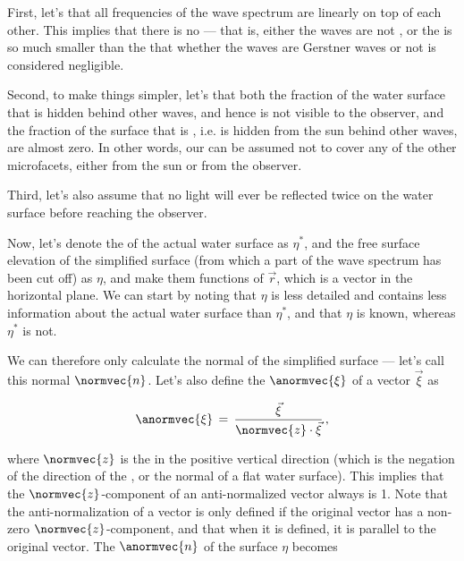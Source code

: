 {First, let's \assume that all frequencies of the wave spectrum are \superposed linearly on top of each other. This implies that there is no  --- that is, either the waves are not , or the  is so much smaller than the \wavelength that whether the waves are Gerstner waves or not is considered negligible.

Second, to make things simpler, let's \assume that both the fraction of the water surface that is hidden behind other waves, and hence is not visible to the observer, and the fraction of the surface that is \shadowed, i.e. is hidden from the sun behind other waves, are almost zero. In other words, our \microfacets can be assumed not to cover any of the other microfacets, either from the sun or from the observer.

Third, let's also assume that no light will ever be reflected twice on the water surface before reaching the observer.

Now, let's denote the  of the actual water surface as $\eta^*$, and the free surface elevation of the simplified surface (from which a part of the wave spectrum has been cut off) as $\eta$, and make them functions of $\vec{r}$, which is a \twodimensional vector in the horizontal plane. We can start by noting that $\eta$ is less detailed and contains less information about the actual water surface than $\eta^*$, and that $\eta$ is known, whereas $\eta^*$ is not.

We can therefore only calculate the normal of the simplified surface --- let's call this normal $\normvec{n}$. Let's also define the  $\anormvec{\xi}$ of a vector $\vec{\xi}$ as

\begin{equation} \label{eq:anti_normal_definition}
\anormvec{\xi} \,=\, \frac{\vec{\xi}}{\normvec{z}\cdot\vec{\xi}}\,,
\end{equation}

where $\normvec{z}$ is the  in the positive vertical direction (which is the negation of the direction of the , or the normal of a flat water surface). This implies that the $\normvec{z}$-component of an anti-normalized vector always is 1. Note that the anti-normalization of a vector is only defined if the original vector has a non-zero $\normvec{z}$-component, and that when it is defined, it is parallel to the original vector. The  $\anormvec{n}$ of the surface $\eta$ becomes

}
